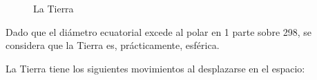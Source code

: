 \begin{figure}[!h]
{ \label{fig:nutacion.tierra}}

  \caption{La Tierra}
\end{figure}

Dado que el di\'ametro ecuatorial excede al polar en 1 parte sobre 298, se considera que la Tierra es, pr\'acticamente, esf\'erica. 

La Tierra tiene los siguientes movimientos al desplazarse en el espacio:

